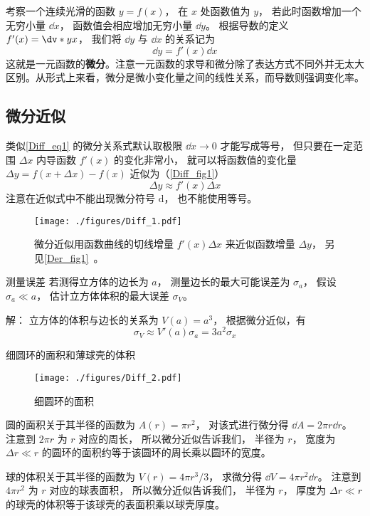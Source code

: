 
考察一个连续光滑的函数 $y = f(x)$， 在 $x$ 处函数值为 $y$， 若此时函数增加一个无穷小量 $\dd{x}$， 函数值会相应增加无穷小量 $\dd{y}$。 根据导数的定义 $f'(x) = \dv*{y}{x}$， 我们将 $\dd{y}$ 与 $\dd{x}$ 的关系记为
\begin{equation}\label{Diff_eq1}
\dd{y} = f'(x) \dd{x}
\end{equation}
这就是一元函数的\textbf{微分}。注意一元函数的求导和微分除了表达方式不同外并无太大区别。从形式上来看，微分是微小变化量之间的线性关系，而导数则强调变化率。

\subsection{微分近似}\label{Diff_sub1}
类似\autoref{Diff_eq1} 的微分关系式默认取极限 $\dd{x} \to 0$ 才能写成等号， 但只要在一定范围 $\Delta x$ 内导函数 $f'(x)$ 的变化非常小， 就可以将函数值的变化量 $\Delta y = f(x+\Delta x)-f(x)$ 近似为（\autoref{Diff_fig1}）
\begin{equation}\label{Diff_eq2}
\Delta y \approx f'(x) \Delta x
\end{equation}
注意在近似式中不能出现微分符号 $\mathrm{d}$， 也不能使用等号。

\begin{figure}[ht]
\centering
\texttt{[image: ./figures/Diff\_1.pdf]}
\caption{微分近似用函数曲线的切线增量 $f'(x)\Delta x$ 来近似函数增量 $\Delta y$， 另见\autoref{Der_fig1}~。} \label{Diff_fig1}
\end{figure}

\begin{example}{测量误差}\label{Diff_ex1}
若测得立方体的边长为 $a$， 测量边长的最大可能误差为 $\sigma_a$， 假设 $\sigma_a \ll a$， 估计立方体体积的最大误差 $\sigma_V$。

解： 立方体的体积与边长的关系为 $V(a)=a^3$， 根据微分近似，有
\begin{equation}
\sigma_V \approx V'(a) \sigma_a = 3a^2 \sigma_x
\end{equation}
\end{example}

\begin{example}{细圆环的面积和薄球壳的体积}\label{Diff_ex2}
\begin{figure}[ht]
\centering
\texttt{[image: ./figures/Diff\_2.pdf]}
\caption{细圆环的面积} \label{Diff_fig2}
\end{figure}
圆的面积关于其半径的函数为 $A(r) = \pi r^2$， 对该式进行微分得 $\dd{A} = 2\pi r\dd{r}$。 注意到 $2\pi r$ 为 $r$ 对应的周长， 所以微分近似告诉我们， 半径为 $r$， 宽度为 $\Delta r \ll r$ 的圆环的面积约等于该圆环的周长乘以圆环的宽度。

球的体积关于其半径的函数为 $V(r) = 4\pi r^3/3$， 求微分得 $\dd{V} = 4\pi r^2 \dd{r}$。 注意到 $4\pi r^2$ 为 $r$ 对应的球表面积， 所以微分近似告诉我们， 半径为 $r$， 厚度为 $\Delta r \ll r$ 的球壳的体积等于该球壳的表面积乘以球壳厚度。
\end{example}
